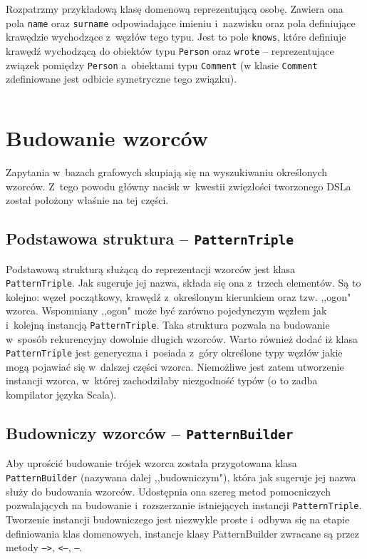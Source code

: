 \documentclass{xmgr}
\begin{document}
Rozpatrzmy przykładową klasę domenową reprezentującą osobę. Zawiera ona pola \texttt{name} oraz \texttt{surname} odpowiadające imieniu i~nazwisku oraz pola definiujące krawędzie wychodzące z~węzłów tego typu. Jest to pole \texttt{knows}, które definiuje krawędź wychodzącą do obiektów typu \texttt{Person} oraz \texttt{wrote} -- reprezentujące związek pomiędzy \texttt{Person} a~obiektami typu \texttt{Comment} (w klasie \texttt{Comment} zdefiniowane jest odbicie symetryczne tego związku).

\newpage

\inputminted{scala}{listings/scala/dsl/sample-model.scala}

\section{Budowanie wzorców}

Zapytania w~bazach grafowych skupiają się na wyszukiwaniu określonych wzorców. Z~tego powodu główny nacisk w~kwestii zwięzłości tworzonego DSLa został położony właśnie na tej części.

\subsection{Podstawowa struktura -- \texttt{PatternTriple}}
Podstawową strukturą służącą do reprezentacji wzorców jest klasa \texttt{PatternTriple}. Jak sugeruje jej nazwa, składa się ona z~trzech elementów. Są to kolejno: węzeł początkowy, krawędź z~określonym kierunkiem oraz tzw. ,,ogon" wzorca. Wspomniany ,,ogon" może być zarówno pojedynczym węzłem jak i~kolejną instancją \texttt{PatternTriple}. Taka struktura pozwala na budowanie w~sposób rekurencyjny dowolnie długich wzorców. Warto również dodać iż klasa \texttt{PatternTriple} jest generyczna i~posiada z~góry określone typy węzłów jakie mogą pojawiać się w~dalszej części wzorca. Niemożliwe jest zatem utworzenie instancji wzorca, w~której zachodziłaby niezgodność typów (o to zadba kompilator języka Scala).

\subsection{Budowniczy wzorców -- \texttt{PatternBuilder}}
Aby uprościć budowanie trójek wzorca została przygotowana klasa \texttt{PatternBuilder} (nazywana dalej ,,budowniczym"), która jak sugeruje jej nazwa służy do budowania wzorców. Udostępnia ona szereg metod pomocniczych pozwalających na budowanie i~rozszerzanie istniejących instancji \texttt{PatternTriple}. Tworzenie instancji budowniczego jest niezwykle proste i~odbywa się na etapie definiowania klas domenowych, instancje klasy PatternBuilder zwracane są przez metody \texttt{-->}, \texttt{<--}, \texttt{--}.
\end{document}
